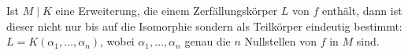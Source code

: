 \begin{remark}
	Ist $M\mid K$ eine Erweiterung, die einem Zerfällungskörper $L$ von $f$ enthält, dann ist dieser nicht nur bis auf die Isomorphie sondern als Teilkörper eindeutig bestimmt: $L = K(\alpha_1, \dots, \alpha_n)$, wobei $\alpha_1, \dots, \alpha_n$ genau die $n$ Nullstellen von $f$ in $M$ sind.
\end{remark}
